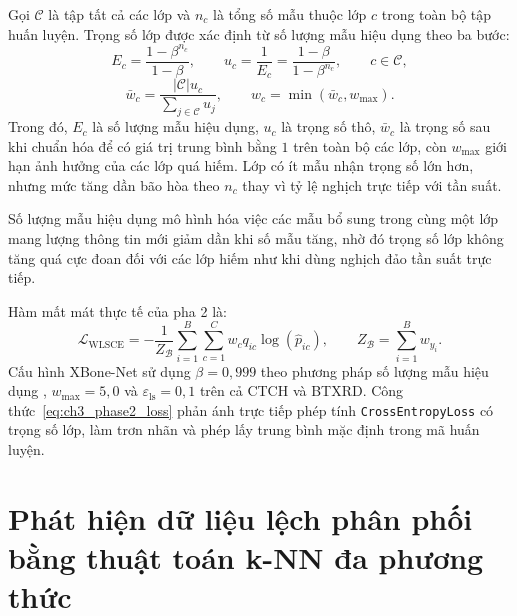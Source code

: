 \begin{enumerate}
    Gọi $\mathcal{C}$ là tập tất cả các lớp và $n_c$ là tổng số mẫu thuộc lớp $c$ trong toàn bộ tập huấn luyện. Trọng số lớp được xác định từ số lượng mẫu hiệu dụng theo ba bước:
    \begin{equation}
    E_c=\frac{1-\beta^{n_c}}{1-\beta},
    \qquad
    u_c=\frac{1}{E_c}=\frac{1-\beta}{1-\beta^{n_c}},
    \qquad c\in\mathcal{C},
    \label{eq:ch3_effective_class_count}
    \end{equation}
    \begin{equation}
    \bar{w}_c
    =
    \frac{|\mathcal{C}|u_c}
    {\sum_{j\in\mathcal{C}}u_j},
    \qquad
    w_c=\min\!\left(\bar{w}_c,w_{\max}\right).
    \label{eq:ch3_effective_class_weight}
    \end{equation}
    Trong đó, $E_c$ là số lượng mẫu hiệu dụng, $u_c$ là trọng số thô, $\bar{w}_c$ là trọng số sau khi chuẩn hóa để có giá trị trung bình bằng $1$ trên toàn bộ các lớp, còn $w_{\max}$ giới hạn ảnh hưởng của các lớp quá hiếm. Lớp có ít mẫu nhận trọng số lớn hơn, nhưng mức tăng dần bão hòa theo $n_c$ thay vì tỷ lệ nghịch trực tiếp với tần suất.

    Số lượng mẫu hiệu dụng mô hình hóa việc các mẫu bổ sung trong cùng một lớp mang lượng thông tin mới giảm dần khi số mẫu tăng, nhờ đó trọng số lớp không tăng quá cực đoan đối với các lớp hiếm như khi dùng nghịch đảo tần suất trực tiếp.

    Hàm mất mát thực tế của pha 2 là:
    \begin{equation}
    \mathcal{L}_{\mathrm{WLSCE}}
    =
    -\frac{1}{Z_{\mathcal{B}}}
    \sum_{i=1}^{B}\sum_{c=1}^{C}
    w_c q_{ic}\log\!\left(\hat{p}_{ic}\right),
    \qquad
    Z_{\mathcal{B}}=\sum_{i=1}^{B}w_{y_i}.
    \label{eq:ch3_phase2_loss}
    \end{equation}
    Cấu hình XBone-Net sử dụng $\beta=0{,}999$ theo phương pháp số lượng mẫu hiệu dụng \cite{Cui2019ClassBalanced}, $w_{\max}=5{,}0$ và $\varepsilon_{\mathrm{ls}}=0{,}1$ trên cả CTCH và BTXRD. Công thức~\ref{eq:ch3_phase2_loss} phản ánh trực tiếp phép tính \texttt{CrossEntropyLoss} có trọng số lớp, làm trơn nhãn và phép lấy trung bình mặc định trong mã huấn luyện.
\end{enumerate}

\section[Phát hiện dữ liệu lệch phân phối bằng thuật toán k-NN đa phương thức]{Phát hiện dữ liệu lệch phân phối bằng thuật toán k-NN đa phương thức}
\label{sec:ch3_multimodal_knn_ood}

